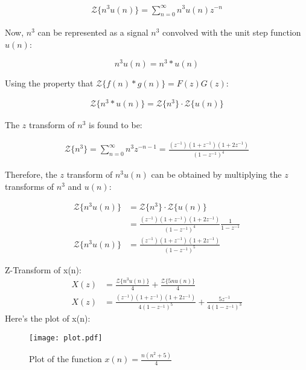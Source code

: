 \documentclass{article}
\begin{document}
\begin{align}
\mathcal{Z}\{n^3u(n)\} = \sum_{n=0}^{\infty} n^3u(n)z^{-n} \end{align}

Now, $n^3$ can be represented as a signal $n^3$ convolved with the unit step function $u(n)$:

\[
 n^3u(n) = n^3 * u(n) 
 \]

Using the property that $\mathcal{Z}\{f(n) * g(n)\} = F(z)G(z)$:

\begin{align}
 \mathcal{Z}\{n^3 * u(n)\} = \mathcal{Z}\{n^3\} \cdot \mathcal{Z}\{u(n)\}
  \end{align}

The $z$ transform of $n^3$ is found to be:

\begin{align}
 \mathcal{Z}\{n^3\} = \sum_{n=0}^{\infty} n^3z^{-n-1} = \frac{(z^{-1})(1+z^{-1})(1+2z^{-1})}{(1-z^{-1})^4}
  \end{align}



Therefore, the $z$ transform of $n^3u(n)$ can be obtained by multiplying the $z$ transforms of $n^3$ and $u(n)$:

\begin{align}
\mathcal{Z}\{n^3u(n)\} &= \mathcal{Z}\{n^3\} \cdot \mathcal{Z}\{u(n)\} \nonumber\\
&= \frac{(z^{-1})(1+z^{-1})(1+2z^{-1})}{(1-z^{-1})^4} \frac{1}{1-z^{-1}}\nonumber \\
\mathcal{Z}\{n^3u(n)\}&= \frac{(z^{-1})(1+z^{-1})(1+2z^{-1})}{(1-z^{-1})^5} 
\end{align}

Z-Transform of x(n):
\begin{align}
X(z) &=  \frac{\mathcal{Z}\{n^3u(n)\}}{4}+ \frac{\mathcal{Z}\{5nu(n)\}}{4}\\
X(z)&= \frac{(z^{-1})(1+z^{-1})(1+2z^{-1})}{4(1-z^{-1})^5}+ \frac{5z^{-1}}{4(1-z^{-1})^3}
\end{align}
\newpage
Here's the plot of x(n):

\begin{figure}[h]
  \centering
  \texttt{[image: plot.pdf]} %
  \caption{Plot of the function $x(n) = \frac{n(n^2+5)}{4}$}
  \label{fig:plot}
\end{figure}
\end{document}
